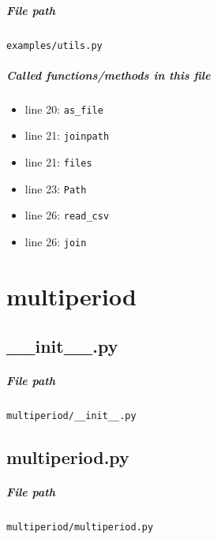 \documentclass[11pt]{report}
\begin{document}
\paragraph{File path} \texttt{examples/utils.py}
\paragraph{Called functions/methods in this file}
\begin{itemize}[leftmargin=*]
  \item line 20: \texttt{as\_file}
  \item line 21: \texttt{joinpath}
  \item line 21: \texttt{files}
  \item line 23: \texttt{Path}
  \item line 26: \texttt{read\_csv}
  \item line 26: \texttt{join}
\end{itemize}

\chapter{multiperiod}
\section{\_\_init\_\_.py}
\label{file:multiperiod-__init__.py}
\paragraph{File path} \texttt{multiperiod/\_\_init\_\_.py}

\section{multiperiod.py}
\label{file:multiperiod-multiperiod.py}
\paragraph{File path} \texttt{multiperiod/multiperiod.py}
\end{document}
